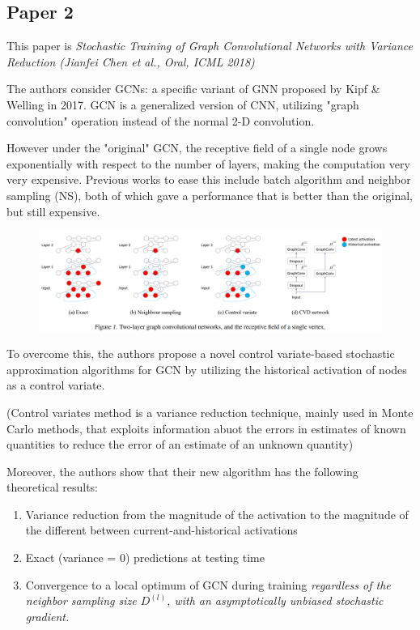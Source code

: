 \documentclass{article}
\begin{document}
\subsection{Paper 2}
This paper is \textit{Stochastic Training of Graph Convolutional Networks with Variance Reduction (Jianfei Chen et al., Oral, ICML 2018)}

The authors consider GCNs: a specific variant of GNN proposed by Kipf \& Welling in 2017.
GCN is a generalized version of CNN, utilizing "graph convolution" operation instead of the normal 2-D convolution.

However under the "original" GCN, the receptive field of a single node grows exponentially with respect to the number of layers, making the computation very very expensive.
Previous works to ease this include batch algorithm and neighbor sampling (NS), both of which gave a performance that is better than the original, but still expensive.

\begin{figure}[hbt]
  \includegraphics[width=\textwidth]{Figure2.png}
\end{figure} 

To overcome this, the authors propose a novel control variate-based stochastic approximation algorithms for GCN by utilizing the historical activation of nodes as a control variate.

(Control variates method is a variance reduction technique, mainly used in Monte Carlo methods, that exploits information abuot the errors in estimates of known quantities to reduce the error of an estimate of an unknown quantity)

Moreover, the authors show that their new algorithm has the following theoretical results:
\begin{enumerate}
\item Variance reduction from the magnitude of the activation to the magnitude of the different between current-and-historical activations
\item Exact (variance = 0) predictions at testing time
\item Convergence to a local optimum of GCN during training \textit{regardless of the neighbor sampling size $D^{(l)}$, with an asymptotically unbiased stochastic gradient.}
\end{enumerate}
\end{document}
